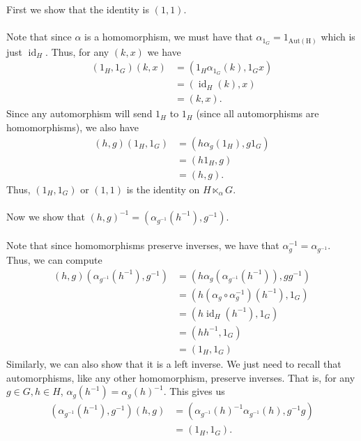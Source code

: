 \documentclass[12 pt, letterpaper]{hmcpset}
\begin{document}
\begin{solution}
	First we show that the identity is $(1, 1)$. \\\\
	Note that since $\alpha$ is a homomorphism, we must have that $\alpha_{1_{G}} = 1_{\operatorname{Aut(H)}}$ which is just $\operatorname{id}_{H}$. Thus, for any $(k, x)$ we have
	\[
		\begin{split}
			(1_{H}, 1_{G})(k, x) & = (1_{H} \alpha_{1_{G}}(k), 1_{G}x) \\
				     & = (\operatorname{id}_{H}(k), x) \\
				     & = (k, x).
		\end{split}
	\]
	Since any automorphism will send $1_{H}$ to $1_{H}$ (since all automorphisms are homomorphisms), we also have
	\[
		\begin{split}
			(h, g)(1_{H}, 1_{G}) & = (h \alpha_{g}(1_{H}), g 1_{G}) \\
					     & = (h 1_{H}, g) \\
					     & = (h, g).
		\end{split}
	\]
	Thus, $(1_{H}, 1_{G})$ or $(1, 1)$ is the identity on $H \ltimes_{\alpha} G$. \\\\
	Now we show that $(h, g)^{-1} = (\alpha_{g^{-1}}(h^{-1}), g^{-1})$. \\\\
	Note that since homomorphisms preserve inverses, we have that $\alpha_{g}^{-1} = \alpha_{g^{-1}}$. Thus, we can compute
	\[
		\begin{split}
			(h, g)(\alpha_{g^{-1}}(h^{-1}), g^{-1}) & = (h \alpha_{g}(\alpha_{g^{-1}}(h^{-1})), g g^{-1}) \\
								& = (h (\alpha_{g} \circ \alpha_{g}^{-1})(h^{-1}), 1_{G}) \\
								& = (h \operatorname{id}_{H}(h^{-1}), 1_{G}) \\
								& = (h h^{-1}, 1_{G}) \\
								& = (1_{H}, 1_{G})
		\end{split}
	\]
	Similarly, we can also show that it is a left inverse. We just need to recall that automorphisms, like any other homomorphism, preserve inverses. That is, for any $g \in G, h \in H$, $\alpha_{g}(h^{-1}) = \alpha_{g}(h)^{-1}$. This gives us
	\[
		\begin{split}
			(\alpha_{g^{-1}}(h^{-1}), g^{-1})(h, g) & = (\alpha_{g^{-1}}(h)^{-1} \alpha_{g^{-1}}(h), g^{-1} g) \\
								& = (1_{H}, 1_{G}).
		\end{split}
	\]
\end{solution}
\end{document}
